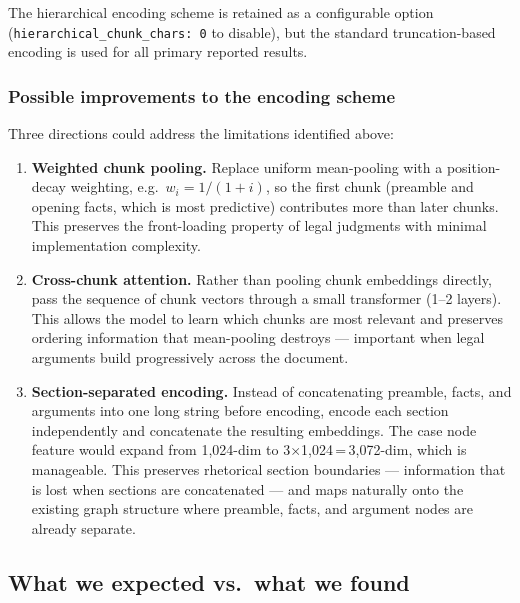 \documentclass[12pt,a4paper]{article}
\begin{document}
The hierarchical encoding scheme is retained as a configurable option (\texttt{hierarchical\_chunk\_chars: 0} to disable), but the standard truncation-based encoding is used for all primary reported results.

\subsubsection*{Possible improvements to the encoding scheme}

Three directions could address the limitations identified above:

\begin{enumerate}[noitemsep]
  \item \textbf{Weighted chunk pooling.} Replace uniform mean-pooling with a position-decay weighting, e.g.\ $w_i = 1/(1+i)$, so the first chunk (preamble and opening facts, which is most predictive) contributes more than later chunks. This preserves the front-loading property of legal judgments with minimal implementation complexity.

  \item \textbf{Cross-chunk attention.} Rather than pooling chunk embeddings directly, pass the sequence of chunk vectors through a small transformer (1--2 layers). This allows the model to learn which chunks are most relevant and preserves ordering information that mean-pooling destroys — important when legal arguments build progressively across the document.

  \item \textbf{Section-separated encoding.} Instead of concatenating preamble, facts, and arguments into one long string before encoding, encode each section independently and concatenate the resulting embeddings. The case node feature would expand from 1{,}024-dim to 3$\times$1{,}024\,=\,3{,}072-dim, which is manageable. This preserves rhetorical section boundaries — information that is lost when sections are concatenated — and maps naturally onto the existing graph structure where preamble, facts, and argument nodes are already separate.
\end{enumerate}

\subsection{What we expected vs.\ what we found}
\end{document}
